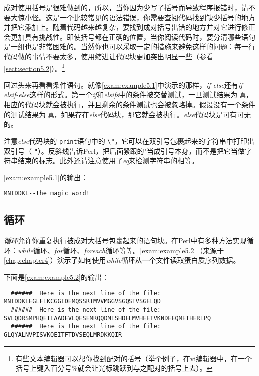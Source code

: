 成对使用括号是很难做到的，所以，当你因为少写了括号而导致程序报错时，请不要大惊小怪。这是一个比较常见的语法错误，你需要查阅代码找到缺少括号的地方并把它添加上。随着代码越来越复杂，要找到成对括号出错的地方并对它进行修正会更加具有挑战性。即使括号都在正确的位置，当你阅读代码时，要分清哪些语句是一组也是非常困难的。当然你也可以采取一定的措施来避免这样的问题：每一行代码做的事情不要太多，使用缩进让代码块更加突出明显一些（参看\autoref{sect:section5.2}）。\footnote{有些文本编辑器可以帮你找到配对的括号（举个例子，在vi编辑器中，在一个括号上键入百分号\%就会让光标跳跃到与之配对的括号上去）。} 

回过头来再看看条件语句。就像\autoref{exam:example5.1}中演示的那样，\textit{if-else}还有\textit{if-elsif-else}这样的形式。第一个\textit{if}和\textit{elsifs}中的条件被交替测试，一旦测试结果为 \verb|真|，相应的代码块就会被执行，并且剩余的条件测试也会被忽略掉。假设没有一个条件的测试结果为 \verb|真|，如果存在\textit{else}代码块，那它就会被执行。\textit{else}代码块是可有可无的。



注意\textit{else}代码块的 \verb|print|语句中的 \verb|\"|，它可以在双引号包裹起来的字符串中打印出双引号（ \verb|"|）。反斜线告诉Perl，把后面紧跟的"当成引号本身，而不是把它当做字符串结束的标志。此外还请注意使用了\textit{eq}来检测字符串的相等。

\autoref{exam:example5.1}的输出：

\begin{lstlisting}
MNIDDKL--the magic word!
\end{lstlisting}

\subsection{循环}
\textit{循环}允许你重复执行被成对大括号包裹起来的语句块。在Perl中有多种方法实现循环：\textit{while}循环、\textit{for}循环、\textit{foreach}循环等等。\autoref{exam:example5.2}（来源于\autoref{chap:chapter4}）演示了如何使用\textit{while}循环从一个文件读取蛋白质序列数据。



下面是\autoref{exam:example5.2}的输出：

\begin{lstlisting}
  ######  Here is the next line of the file:
MNIDDKLEGLFLKCGGIDEMQSSRTMVVMGGVSGQSTVSGELQD
  ######  Here is the next line of the file:
SVLQDRSMPHQEILAADEVLQESEMRQQDMISHDELMVHEETVKNDEEQMETHERLPQ
  ######  Here is the next line of the file:
GLQYALNVPISVKQEITFTDVSEQLMRDKKQIR
\end{lstlisting}

